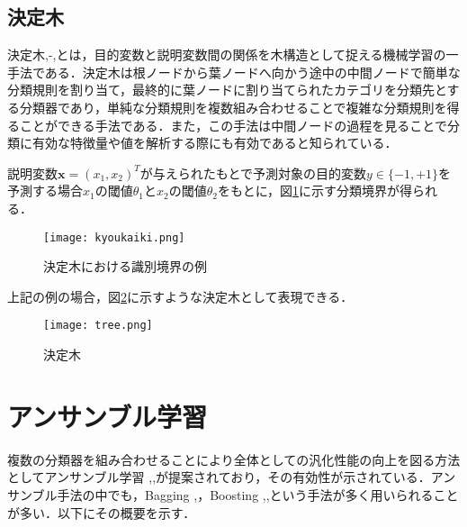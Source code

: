 \subsection{決定木}
決定木\cite{Safavian02},-,\cite{Wilkinson92}とは，目的変数と説明変数間の関係を木構造として捉える機械学習の一手法である．決定木は根ノードから葉ノードへ向かう途中の中間ノードで簡単な分類規則を割り当て，最終的に葉ノードに割り当てられたカテゴリを分類先とする分類器であり，単純な分類規則を複数組み合わせることで複雑な分類規則を得ることができる手法である．また，この手法は中間ノードの過程を見ることで分類に有効な特徴量や値を解析する際にも有効であると知られている．

説明変数$\bm{x}=(x_{1},x_{2})^T$が与えられたもとで予測対象の目的変数$y \in \{-1,+1\}$を予測する場合$x_1$の閾値$\theta_1$と$x_2$の閾値$\theta_2$をもとに，図\ref{kyoukaitree}に示す分類境界が得られる．

\begin{figure}[H]
\centering
\texttt{[image: kyoukaiki.png]}
\caption{決定木における識別境界の例}
\label{kyoukaitree}
\end{figure}
上記の例の場合，図\ref{tree}に示すような決定木として表現できる．
\begin{figure}[H]
\centering
\texttt{[image: tree.png]}
\caption{決定木}
\label{tree}
\end{figure}


\newpage
\section{アンサンブル学習}

複数の分類器を組み合わせることにより全体としての汎化性能の向上を図る方法としてアンサンブル学習
\cite{Liu99},\;\cite{Ueda02},\;\cite{Ueda05}が提案されており，その有効性が示されている．アンサンブル手法の中でも，Bagging \cite{Breiman96},\;\cite{RF}，Boosting \cite{Cortes94},\;\cite{Freund97},\;\cite{Hirai12}という手法が多く用いられることが多い．以下にその概要を示す．
